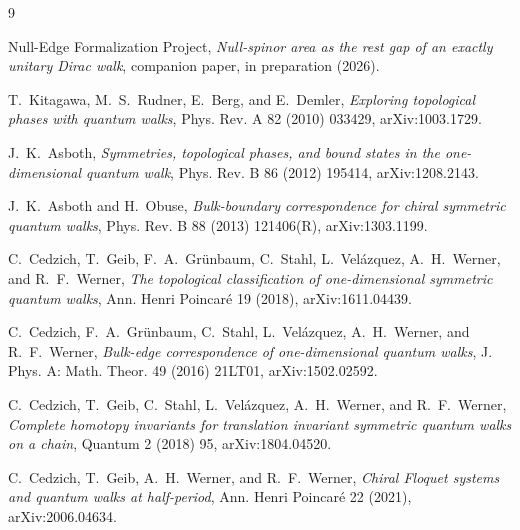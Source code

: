 \documentclass[11pt]{article}
\begin{document}
\begin{thebibliography}{9}

Null-Edge Formalization Project,
\emph{Null-spinor area as the rest gap of an exactly unitary Dirac walk},
companion paper, in preparation (2026).

T.~Kitagawa, M.~S.~Rudner, E.~Berg, and E.~Demler,
\emph{Exploring topological phases with quantum walks},
Phys. Rev. A 82 (2010) 033429, arXiv:1003.1729.

J.~K.~Asboth,
\emph{Symmetries, topological phases, and bound states in the
one-dimensional quantum walk}, Phys. Rev. B 86 (2012) 195414,
arXiv:1208.2143.

J.~K.~Asboth and H.~Obuse,
\emph{Bulk-boundary correspondence for chiral symmetric quantum walks},
Phys. Rev. B 88 (2013) 121406(R), arXiv:1303.1199.

C.~Cedzich, T.~Geib, F.~A.~Gr\"unbaum, C.~Stahl, L.~Vel\'azquez,
A.~H.~Werner, and R.~F.~Werner,
\emph{The topological classification of one-dimensional symmetric quantum
walks}, Ann. Henri Poincar\'e 19 (2018), arXiv:1611.04439.

C.~Cedzich, F.~A.~Gr\"unbaum, C.~Stahl, L.~Vel\'azquez, A.~H.~Werner, and
R.~F.~Werner,
\emph{Bulk-edge correspondence of one-dimensional quantum walks},
J. Phys. A: Math. Theor. 49 (2016) 21LT01, arXiv:1502.02592.

C.~Cedzich, T.~Geib, C.~Stahl, L.~Vel\'azquez, A.~H.~Werner, and
R.~F.~Werner,
\emph{Complete homotopy invariants for translation invariant symmetric
quantum walks on a chain}, Quantum 2 (2018) 95, arXiv:1804.04520.

C.~Cedzich, T.~Geib, A.~H.~Werner, and R.~F.~Werner,
\emph{Chiral Floquet systems and quantum walks at half-period},
Ann. Henri Poincar\'e 22 (2021), arXiv:2006.04634.

\end{thebibliography}
\end{document}
